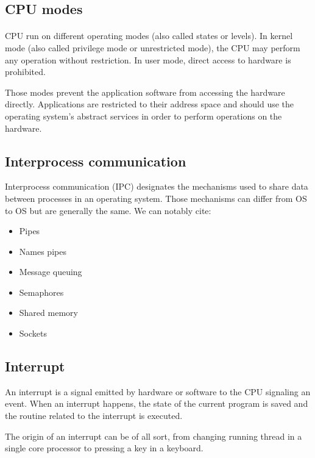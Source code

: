 \subsection{CPU modes}
\paragraph{}
CPU run on different operating modes (also called states or levels).
In kernel mode (also called privilege mode or unrestricted mode), the CPU may perform any operation without restriction.
In user mode, direct access to hardware is prohibited.

Those modes prevent the application software from accessing the hardware directly.
Applications are restricted to their address space 
    and should use the operating system's abstract services in order to perform operations on the hardware.

\subsection{Interprocess communication}
Interprocess communication (IPC) designates the mechanisms used to share data between processes in an operating system.
Those mechanisms can differ from OS to OS but are generally the same.
We can notably cite:
\begin{itemize}
    \item Pipes
    \item Names pipes
    \item Message queuing
    \item Semaphores
    \item Shared memory
    \item Sockets
\end{itemize}

\subsection{Interrupt}
An interrupt is a signal emitted by hardware or software to the CPU signaling an event.
When an interrupt happens, the state of the current program is saved 
    and the routine related to the interrupt is executed.

The origin of an interrupt can be of all sort, 
    from changing running thread in a single core processor to pressing a key in a keyboard.

